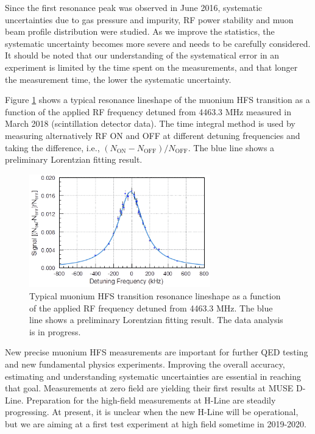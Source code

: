 Since the first resonance peak was observed in June 2016,
systematic uncertainties due to gas pressure and impurity,
RF power stability and muon beam profile distribution were
studied.  As we improve the statistics, the systematic uncertainty
becomes more severe and needs to be carefully considered.
It should be noted that our understanding of the systematical
error in an experiment is limited by the time spent on the
measurements, and that longer the measurement time, the
lower the systematic uncertainty.


Figure \ref{fig:MuSEUM-MuSEUM-lineshape} shows a typical
resonance lineshape of the muonium HFS transition as a
function of the applied RF frequency detuned from 4463.3 MHz
measured in March 2018 (scintillation detector data).
The time integral method is used by measuring alternatively
RF ON and OFF at different detuning frequencies and taking
the difference, i.e., 
$(N_{\text{ON}}-N_{\text{OFF}})/N_{\text{OFF}}$.  
The blue line shows a preliminary Lorentzian fitting result.
   

\begin{figure}[th]
 \centering
 \includegraphics[width=0.7\textwidth, bb=0 0 227 142]
                 {./Fig/MuHFS-MuSEUM-lineshape.png}
\caption{\label{fig:MuSEUM-MuSEUM-lineshape}
Typical muonium HFS transition resonance lineshape as a
function of the applied RF frequency detuned from 4463.3 MHz.
The blue line shows a preliminary Lorentzian fitting result.
The data analysis is in progress.
}
\end{figure}


New precise muonium HFS measurements are important for further
QED testing and new fundamental physics experiments.  Improving
the overall accuracy, estimating and understanding systematic
uncertainties are essential in reaching that goal.  Measurements
at zero field are yielding their first results at MUSE D-Line.
Preparation for the high-field measurements at H-Line are
steadily progressing.  At present, it is unclear when the
new H-Line will be operational, but we are aiming at a first
test experiment at high field sometime in 2019-2020.



